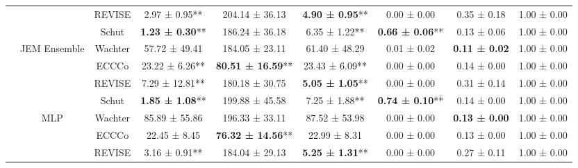 \begin{table}
{\begin{tabular}[t]{>{}c|c|c|c|c|c|c|c|c}
 &  & REVISE & 2.97 ± 0.95** & 204.14 ± 36.13\hphantom{*}\hphantom{*} & \textbf{4.90 ± 0.95}** & 0.00 ± 0.00\hphantom{*}\hphantom{*} & 0.35 ± 0.18\hphantom{*}\hphantom{*} & 1.00 ± 0.00\hphantom{*}\hphantom{*}\\

 &  & Schut & \textbf{1.23 ± 0.30}** & 186.24 ± 36.18\hphantom{*}\hphantom{*} & 6.35 ± 1.22** & \textbf{0.66 ± 0.06}** & 0.13 ± 0.06\hphantom{*}\hphantom{*} & 1.00 ± 0.00\hphantom{*}\hphantom{*}\\

 & \multirow{-4}{*}{\centering\arraybackslash JEM Ensemble} & Wachter & 57.72 ± 49.41\hphantom{*}\hphantom{*} & 184.05 ± 23.11\hphantom{*}\hphantom{*} & 61.40 ± 48.29\hphantom{*}\hphantom{*} & 0.01 ± 0.02\hphantom{*}\hphantom{*} & \textbf{0.11 ± 0.02}\hphantom{*}\hphantom{*} & 1.00 ± 0.00\hphantom{*}\hphantom{*}\\
\cline{2-9}
 &  & ECCCo & 23.22 ± 6.26** & \textbf{80.51 ± 16.59}** & 23.43 ± 6.09** & 0.00 ± 0.00\hphantom{*}\hphantom{*} & 0.14 ± 0.00\hphantom{*}\hphantom{*} & 1.00 ± 0.00\hphantom{*}\hphantom{*}\\

 &  & REVISE & 7.29 ± 12.81** & 180.18 ± 30.75\hphantom{*}\hphantom{*} & \textbf{5.05 ± 1.05}** & 0.00 ± 0.00\hphantom{*}\hphantom{*} & 0.31 ± 0.14\hphantom{*}\hphantom{*} & 1.00 ± 0.00\hphantom{*}\hphantom{*}\\

 &  & Schut & \textbf{1.85 ± 1.08}** & 199.88 ± 45.58\hphantom{*}\hphantom{*} & 7.25 ± 1.88** & \textbf{0.74 ± 0.10}** & 0.14 ± 0.00\hphantom{*}\hphantom{*} & 1.00 ± 0.00\hphantom{*}\hphantom{*}\\

 & \multirow{-4}{*}{\centering\arraybackslash MLP} & Wachter & 85.89 ± 55.86\hphantom{*}\hphantom{*} & 196.33 ± 33.11\hphantom{*}\hphantom{*} & 87.52 ± 53.98\hphantom{*}\hphantom{*} & 0.00 ± 0.00\hphantom{*}\hphantom{*} & \textbf{0.13 ± 0.00}\hphantom{*}\hphantom{*} & 1.00 ± 0.00\hphantom{*}\hphantom{*}\\
\cline{2-9}
 &  & ECCCo & 22.45 ± 8.45\hphantom{*}\hphantom{*} & \textbf{76.32 ± 14.56}** & 22.99 ± 8.31\hphantom{*}\hphantom{*} & 0.00 ± 0.00\hphantom{*}\hphantom{*} & 0.13 ± 0.00\hphantom{*}\hphantom{*} & 1.00 ± 0.00\hphantom{*}\hphantom{*}\\

 &  & REVISE & 3.16 ± 0.91** & 184.04 ± 29.13\hphantom{*}\hphantom{*} & \textbf{5.25 ± 1.31}** & 0.00 ± 0.00\hphantom{*}\hphantom{*} & 0.27 ± 0.11\hphantom{*}\hphantom{*} & 1.00 ± 0.00\hphantom{*}\hphantom{*}\\


\end{tabular}}
\end{table}
